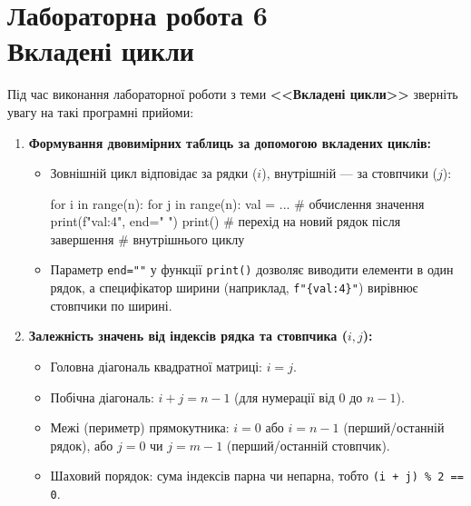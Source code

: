 
 \chapter{Лабораторна робота 6\\ Вкладені цикли}
 
 Під час виконання лабораторної роботи з теми \textbf{<<Вкладені цикли>>} зверніть увагу на такі програмні прийоми:
 
 \begin{enumerate}[label=\arabic*.]
 	\item \textbf{Формування двовимірних таблиць за допомогою вкладених циклів:}
 	\begin{itemize}
 		\item Зовнішній цикл відповідає за рядки ($i$), внутрішній — за стовпчики ($j$):
 			\begin{py}{}
 for i in range(n):
    for j in range(n):
         val = ...  \# обчислення значення
         print(f"{val:4}", end=" ")
    print() # перехід на новий рядок після завершення 
            # внутрішнього циклу
  		\end{py}
 	
 		\item Параметр \texttt{end=""} у функції \texttt{print()} дозволяє виводити елементи в один рядок, а специфікатор ширини (наприклад, \texttt{f"\{val:4\}"}) вирівнює стовпчики по ширині.
 	\end{itemize}
 	
 	\item \textbf{Залежність значень від індексів рядка та стовпчика ($i, j$):}
 	\begin{itemize}
 		\item Головна діагональ квадратної матриці: $i = j$.
 		\item Побічна діагональ: $i + j = n - 1$ (для нумерації від 0 до $n-1$).
 		\item Межі (периметр) прямокутника: $i = 0$ або $i = n-1$ (перший/останній рядок), або $j = 0$ чи $j = m-1$ (перший/останній стовпчик).
 		\item Шаховий порядок: сума індексів парна чи непарна, тобто \texttt{(i + j) \% 2 == 0}.
 	\end{itemize}
 	 \end{enumerate}
 \bigskip
 

